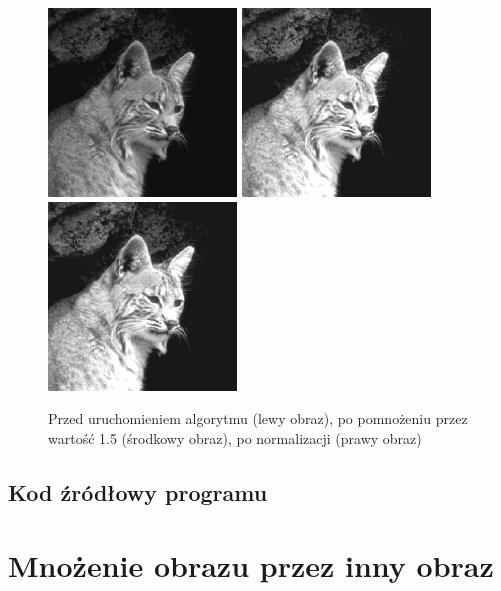 \documentclass[a4paper,12pt]{book}
\begin{document}
\begin{figure}[H]
	\caption{Przed uruchomieniem algorytmu (lewy obraz), po pomnożeniu przez wartość 1.5 (środkowy obraz), po normalizacji (prawy obraz)}
	\includegraphics[width=5cm, height=5cm]{cat-unmodified.jpg}
	\includegraphics[width=5cm, height=5cm]{2/multiply-gray-const-4.png}
	\includegraphics[width=5cm, height=5cm]{2/multiply-gray-const-4-norm.png}
\end{figure}

\subsection{Kod źródłowy programu}

\section{Mnożenie obrazu przez inny obraz}
\end{document}
